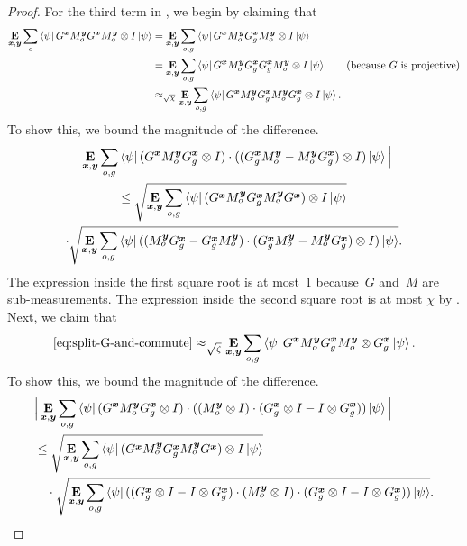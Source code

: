 \begin{proof}
For the third term in , we begin by claiming that
\begin{align}
\mathop{\bf E\/}_{{\boldsymbol{x}}, \boldsymbol{y}} \sum_o \bra{\psi} G^{{\boldsymbol{x}}} M^{\boldsymbol{y}}_o
        G^{{\boldsymbol{x}}} M^{\boldsymbol{y}}_o \otimes I \ket{\psi}
& = 
\mathop{\bf E\/}_{{\boldsymbol{x}}, \boldsymbol{y}} \sum_{o, g}  \bra{\psi} G^{{\boldsymbol{x}}} M^{\boldsymbol{y}}_o
        G^{{\boldsymbol{x}}}_{g} M^{\boldsymbol{y}}_o \otimes I \ket{\psi}\nonumber\\
& = 
\mathop{\bf E\/}_{{\boldsymbol{x}}, \boldsymbol{y}} \sum_{o, g}  \bra{\psi} G^{{\boldsymbol{x}}} M^{\boldsymbol{y}}_o G^{{\boldsymbol{x}}}_g
        G^{{\boldsymbol{x}}}_{g} M^{\boldsymbol{y}}_o \otimes I \ket{\psi} \tag{because~$G$ is projective}\\
& \approx_{\sqrt{\chi}} 
\mathop{\bf E\/}_{{\boldsymbol{x}}, \boldsymbol{y}} \sum_{o, g}  \bra{\psi}  G^{{\boldsymbol{x}}} M^{\boldsymbol{y}}_o G^{{\boldsymbol{x}}}_g
        M^{\boldsymbol{y}}_o G^{{\boldsymbol{x}}}_{g}  \otimes I \ket{\psi}.\label{eq:split-G-and-commute}
\end{align}
To show this, we bound the magnitude of the difference.
\begin{multline*}
\Big|\mathop{\bf E\/}_{{\boldsymbol{x}}, \boldsymbol{y}} \sum_{o, g}  \bra{\psi}  (G^{{\boldsymbol{x}}}
        M^{\boldsymbol{y}}_{o} G^{{\boldsymbol{x}}}_g \otimes I) \cdot ((G^{{\boldsymbol{x}}}_g M^{\boldsymbol{y}}_o - M^{\boldsymbol{y}}_o G^{{\boldsymbol{x}}}_{g}) \otimes I)\ket{\psi}\Big|\\
\leq \sqrt{\mathop{\bf E\/}_{{\boldsymbol{x}}, \boldsymbol{y}} \sum_{o, g}  \bra{\psi} (G^{{\boldsymbol{x}}} M^{\boldsymbol{y}}_o G^{{\boldsymbol{x}}}_g
        M^{\boldsymbol{y}}_{o} G^{{\boldsymbol{x}}}) \otimes I\ket{\psi}}\\
\cdot \sqrt{\mathop{\bf E\/}_{{\boldsymbol{x}}, \boldsymbol{y}} \sum_{o, g}  \bra{\psi}  ((M^{\boldsymbol{y}}_o G^{{\boldsymbol{x}}}_g  -  G^{{\boldsymbol{x}}}_{g} M^{\boldsymbol{y}}_o) \cdot (G^{{\boldsymbol{x}}}_g M^{\boldsymbol{y}}_o - M^{\boldsymbol{y}}_o G^{{\boldsymbol{x}}}_{g}) \otimes I) \ket{\psi}}.
\end{multline*}
The expression inside the first square root is at most~$1$ because~$G$ and~$M$ are sub-measurements.
The expression inside the second square root is at most $\chi$ by .
Next, we claim that
\begin{equation}\label{eq:move-G-for-great-justice}
\eqref{eq:split-G-and-commute}
\approx_{\sqrt{\zeta}} \mathop{\bf E\/}_{{\boldsymbol{x}}, \boldsymbol{y}} \sum_{o, g}  \bra{\psi}   G^{{\boldsymbol{x}}} M^{\boldsymbol{y}}_o
        G^{{\boldsymbol{x}}}_{g} M^{\boldsymbol{y}}_o \otimes G^{{\boldsymbol{x}}}_g\ket{\psi}.
\end{equation}
To show this, we bound the magnitude of the difference.
\begin{align*}
&\Big|  \E_{\bx, \by} \sum_{o, g}  \bra{\psi} (G^{\bx} M^{\by}_{o} G^{\bx}_g \ot I)
	\cdot ((M^{\by}_{o} \otimes I) \cdot(G^{\bx}_g \otimes I - I \otimes G^{\bx}_g))\ket{\psi}\Big|\\
&\leq  \sqrt{\E_{\bx, \by} \sum_{o, g} \bra{\psi} (G^{\bx} M^{\by}_o G^{\bx}_g M^{\by}_{o} G^{\bx}) \ot I \ket{\psi}}\\
&\quad \cdot \sqrt{ \E_{\bx, \by} \sum_{o, g}  \bra{\psi}   ((G^{\bx}_g \otimes I - I \otimes G^{\bx}_g) \cdot (M^{\by}_{o} \otimes I) \cdot (G^{\bx}_g \otimes I - I \otimes G^{\bx}_g)) \ket{\psi}}.

\end{align*}
\end{proof}
